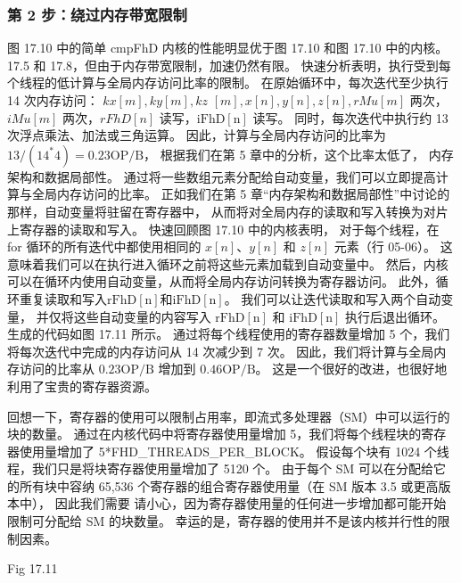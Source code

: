 \subsubsection{第 2 步：绕过内存带宽限制}
图 17.10 中的简单 cmpFhD 内核的性能明显优于图 17.10 和图 17.10 中的内核。 
17.5 和 17.8，但由于内存带宽限制，加速仍然有限。 快速分析表明，执行受到每个线程的低计算与全局内存访问比率的限制。 
在原始循环中，每次迭代至少执行 14 次内存访问： $k x[m], k y[m], k z$ $[m], x[n], y[n], z[n], r M u [m]$ 两次，
$i M u[m]$ 两次，$r F h D[n]$ 读写，$\mathrm{iFhD}[\mathrm{n}]$ 读写。 
同时，每次迭代中执行约 13 次浮点乘法、加法或三角运算。 
因此，计算与全局内存访问的比率为 $13 /\left(14^{*} 4\right)=0.23 \mathrm{OP} / \mathrm{B}$，
根据我们在第 5 章中的分析，这个比率太低了， 内存架构和数据局部性。 
通过将一些数组元素分配给自动变量，我们可以立即提高计算与全局内存访问的比率。 
正如我们在第 5 章“内存架构和数据局部性”中讨论的那样，自动变量将驻留在寄存器中，
从而将对全局内存的读取和写入转换为对片上寄存器的读取和写入。 
快速回顾图 17.10 中的内核表明，
对于每个线程，在 for 循环的所有迭代中都使用相同的 $x[n]、y[n]$ 和 $z[n]$ 元素（行 05-06）。 
这意味着我们可以在执行进入循环之前将这些元素加载到自动变量中。 
然后，内核可以在循环内使用自动变量，从而将全局内存访问转换为寄存器访问。 
此外，循环重复读取和写入$\mathrm{rFhD}[\mathrm{n}]$和$\mathrm{iFhD}[\mathrm{n}]$。 
我们可以让迭代读取和写入两个自动变量，
并仅将这些自动变量的内容写入 $\mathrm{rFhD}[\mathrm{n}]$ 和 $\mathrm{iFhD}[\mathrm{n} ]$ 执行后退出循环。 
生成的代码如图 17.11 所示。 通过将每个线程使用的寄存器数量增加 5 个，我们将每次迭代中完成的内存访问从 14 次减少到 7 次。 
因此，我们将计算与全局内存访问的比率从 $0.23 \mathrm{OP} / \mathrm{B}$ 增加到 $0.46 \mathrm{OP} / \mathrm{B}$。 
这是一个很好的改进，也很好地利用了宝贵的寄存器资源。

回想一下，寄存器的使用可以限制占用率，即流式多处理器（SM）中可以运行的块的数量。 
通过在内核代码中将寄存器使用量增加 5，我们将每个线程块的寄存器使用量增加了 5*FHD\_THREADS\_PER\_BLOCK。 
假设每个块有 1024 个线程，我们只是将块寄存器使用量增加了 5120 个。
由于每个 SM 可以在分配给它的所有块中容纳 65,536 个寄存器的组合寄存器使用量（在 SM 版本 3.5 或更高版本中），
因此我们需要 请小心，因为寄存器使用量的任何进一步增加都可能开始限制可分配给 SM 的块数量。 
幸运的是，寄存器的使用并不是该内核并行性的限制因素。

{\color{red} Fig 17.11}

